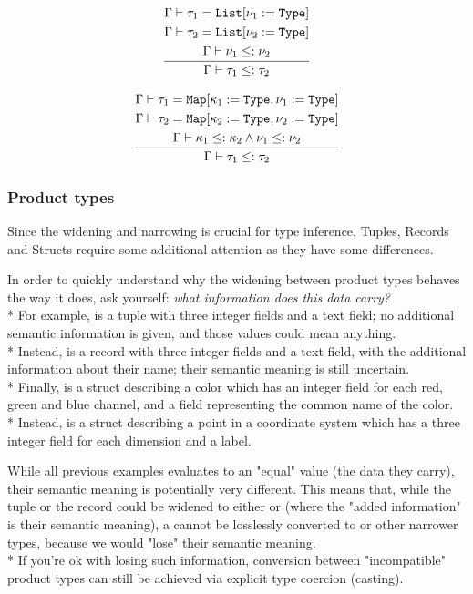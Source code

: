 \[
	\frac{\begin{gathered}
		\Gamma\vdash \tau_1 = \texttt{List}[\nu_1:=\texttt{Type}]\\*
		\Gamma\vdash \tau_2 = \texttt{List}[\nu_2:=\texttt{Type}]\\*
		\Gamma\vdash \nu_1 \leq: \nu_2
	\end{gathered}}{\begin{gathered}
		\Gamma\vdash \tau_1 \leq: \tau_2
	\end{gathered}}
\]

\[
	\frac{\begin{gathered}
		\Gamma\vdash \tau_1 = \texttt{Map}[\kappa_1:=\texttt{Type}, \nu_1:=\texttt{Type}]\\*
		\Gamma\vdash \tau_2 = \texttt{Map}[\kappa_2:=\texttt{Type}, \nu_2:=\texttt{Type}]\\*
		\Gamma\vdash \kappa_1 \leq: \kappa_2 \land \nu_1 \leq: \nu_2
	\end{gathered}}{\begin{gathered}
		\Gamma\vdash \tau_1 \leq: \tau_2
	\end{gathered}}
\]

\clearpage

\subsubsection{Product types}
\label{sec:product_types_compatibility}

Since the widening and narrowing is crucial for type inference, Tuples, Records
and Structs require some additional attention as they have some differences.

\vspace{\baselineskip}

In order to quickly understand why the widening between product types behaves
the way it does, ask yourself: \textit{what information does this data
carry?}\\*
For example,  is a tuple with three integer fields and a
text field; no additional semantic information is given, and those values could
mean anything.\\*
Instead,  is a record with three integer
fields and a text field, with the additional information about their name;
their semantic meaning is still uncertain.\\*
Finally,  is a struct describing a color
which has an integer field for each red, green and blue channel, and a field
representing the common name of the color.\\*
Instead,  is a struct describing
a point in a coordinate system which has a three integer field for each
dimension and a label.

\vspace{\baselineskip}

While all previous examples evaluates to an "equal" value (the data they
carry), their semantic meaning is potentially very different. This means that,
while the tuple or the record could be widened to either  or
 (where the "added information" is their semantic meaning), a
 cannot be losslessly converted to  or other narrower
types, because we would "lose" their semantic meaning.\\*
If you're ok with losing such information, conversion between "incompatible"
product types can still be achieved via explicit type coercion (casting).

